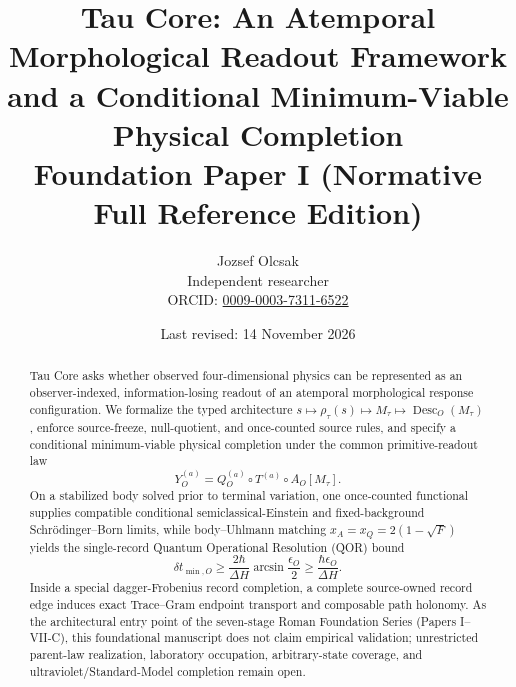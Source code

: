 \documentclass[11pt]{article}
\title{\textbf{Tau Core: An Atemporal Morphological Readout Framework and a Conditional Minimum-Viable Physical Completion}\\
\large Foundation Paper I (Normative Full Reference Edition)}
\author{Jozsef Olcsak\\
\small Independent researcher\\{\small ORCID: \href{https://orcid.org/0009-0003-7311-6522}{0009-0003-7311-6522}}}
\date{Last revised: 14 November 2026}
\newcommand{\Desc}{\operatorname{Desc}}
\begin{document}
\maketitle

\begin{abstract}
Tau Core asks whether observed four-dimensional physics can be represented as an observer-indexed, information-losing readout of an atemporal morphological response configuration. We formalize the typed architecture \(s\mapsto\rho_\tau(s)\mapsto M_\tau\mapsto\Desc_O(M_\tau)\), enforce source-freeze, null-quotient, and once-counted source rules, and specify a conditional minimum-viable physical completion under the common primitive-readout law
\[
 Y_O^{(a)}=Q_O^{(a)}\circ T^{(a)}\circ A_O[M_\tau].
\]
On a stabilized body solved prior to terminal variation, one once-counted functional supplies compatible conditional semiclassical-Einstein and fixed-background Schr\"odinger--Born limits, while body--Uhlmann matching \(x_A=x_Q=2(1-\sqrt F)\) yields the single-record Quantum Operational Resolution (QOR) bound
\[
 \delta t_{\min,O}\geq\frac{2\hbar}{\Delta H}\arcsin\frac{\epsilon_O}{2}\geq\frac{\hbar\epsilon_O}{\Delta H}.
\]
Inside a special dagger-Frobenius record completion, a complete source-owned record edge induces exact Trace--Gram endpoint transport and composable path holonomy. As the architectural entry point of the seven-stage Roman Foundation Series (Papers I--VII-C), this foundational manuscript does not claim empirical validation; unrestricted parent-law realization, laboratory occupation, arbitrary-state coverage, and ultraviolet/Standard-Model completion remain open.
\end{abstract}

\begin{center}
\end{center}
\end{document}
